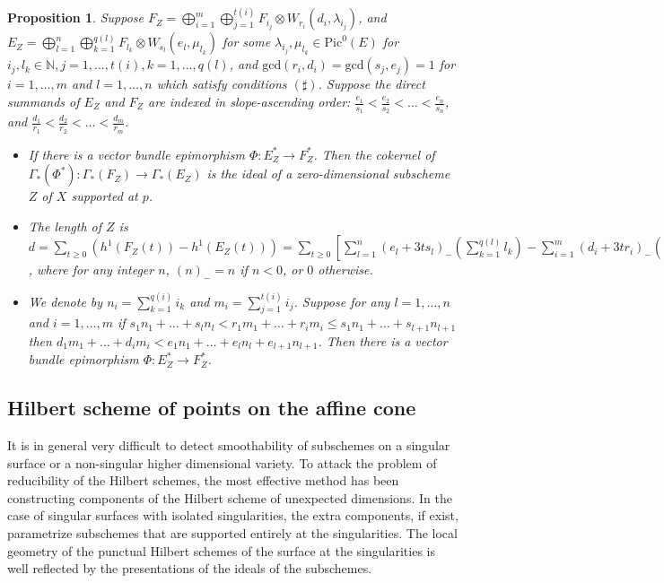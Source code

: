 \documentclass[12pt,oneside,reqno]{amsart}
\newtheorem{prop}[theorem]{Proposition}
\theoremstyle{definition}
\begin{document}
\begin{prop} 
Suppose $F_Z = \bigoplus_{i = 1}^{m} \bigoplus_{j = 1}^{t(i)}F_{i_j} \otimes W_{r_i}(d_i, \lambda_{i_j})$, and $E_Z = \bigoplus_{l = 1}^{n} \bigoplus_{k = 1}^{q(l)}F_{l_k} \otimes W_{s_l}(e_l, \mu_{l_k})$ for some $\lambda_{i_j}, \mu_{l_k} \in \mathrm{Pic}^0(E)$ for $i_j, l_k \in \mathbb{N}, j = 1, \dots, t(i), k = 1, \dots, q(l)$, and $\mathrm{gcd}(r_i, d_i) = \mathrm{gcd}(s_j, e_j) = 1$ for $i = 1, \dots, m$ and $l = 1, \dots, n$ which satisfy conditions $(\sharp)$. Suppose the direct summands of $E_Z$ and $F_Z$ are indexed in slope-ascending order: $\frac{e_1}{s_1} < \frac{e_2}{s_2} < \dots < \frac{e_n}{s_n}$, and $\frac{d_1}{r_1} < \frac{d_2}{r_2} < \dots < \frac{d_m}{r_m}$. 
\begin{itemize}
\item[(1)]
If there is a vector bundle epimorphism $\Phi: E_Z^* \to F_Z^*$. Then the cokernel of $\Gamma_*(\Phi^*): \Gamma_*(F_Z) \to \Gamma_*(E_Z)$ is the ideal of a zero-dimensional subscheme $Z$ of $X$ supported at $p$. 
\item[(2)]
The length of $Z$ is $d = \sum_{t \geq 0} (h^1(F_Z(t)) - h^1(E_Z(t))) = \sum_{t \geq 0}[\sum_{l = 1}^{n}(e_l + 3ts_l)_-(\sum_{k = 1}^{q(l)}l_k) - \sum_{i = 1}^{m}(d_i + 3tr_i)_-(\sum_{j = 1}^{t(i)}i_j)]$, where for any integer $n$, $(n)_- = n$ if $n < 0$, or $0$ otherwise. 
\item[(3)]
We denote by $n_i = \sum_{k = 1}^{q(i)}i_k$ and $m_i = \sum_{j = 1}^{t(i)}i_j$. Suppose for any $l = 1, \dots, n$ and $i = 1, \dots, m$ if $s_1n_1 + \dots + s_ln_l < r_1m_1 + \dots + r_im_i \leq s_1n_1 + \dots + s_{l + 1}n_{l + 1}$ then $d_1m_1 + \dots + d_im_i < e_1n_1 + \dots + e_ln_l + e_{l + 1}n_{l + 1}$. Then there is a vector bundle epimorphism $\Phi: E_Z^* \to F_Z^*$.
\end{itemize}
\end{prop} 

\subsection{Hilbert scheme of points on the affine cone}

It is in general very difficult to detect smoothability of subschemes on a singular surface or a non-singular higher dimensional variety. To attack the problem of reducibility of the Hilbert schemes, the most effective method has been constructing components of the Hilbert scheme of unexpected dimensions. In the case of singular surfaces with isolated singularities, the extra components, if exist, parametrize subschemes that are supported entirely at the singularities. The local geometry of the punctual Hilbert schemes of the surface at the singularities is well reflected by the presentations of the ideals of the subschemes. 
\end{document}
